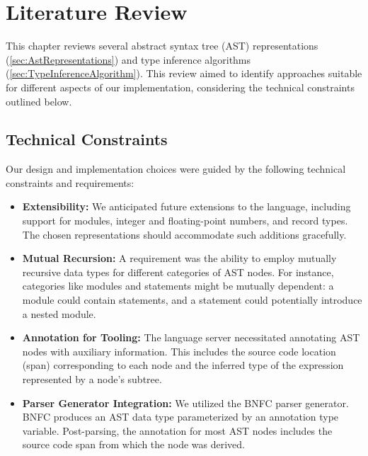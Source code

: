 \chapter{Literature Review}
\label{chap:LiteratureReview}

This chapter reviews several abstract syntax tree (AST) representations (\cref{sec:AstRepresentations}) and type inference algorithms (\cref{sec:TypeInferenceAlgorithm}). This review aimed to identify approaches suitable for different aspects of our implementation, considering the technical constraints outlined below.

\section{Technical Constraints}
\label{chap:LiteratureReview:sec:AstRepresentations:TechnicalConstraints}

Our design and implementation choices were guided by the following technical constraints and requirements:

\begin{itemize}
  \item \textbf{Extensibility:} We anticipated future extensions to the language, including support for modules, integer and floating-point numbers, and record types. The chosen representations should accommodate such additions gracefully.
  \item \textbf{Mutual Recursion:} A requirement was the ability to employ mutually recursive data types for different categories of AST nodes. For instance, categories like modules and statements might be mutually dependent: a module could contain statements, and a statement could potentially introduce a nested module.
  \item \textbf{Annotation for Tooling:} The language server necessitated annotating AST nodes with auxiliary information. This includes the source code location (span) corresponding to each node and the inferred type of the expression represented by a node's subtree.
  \item \textbf{Parser Generator Integration:} We utilized the BNFC parser generator. BNFC produces an AST data type parameterized by an annotation type variable. Post-parsing, the annotation for most AST nodes includes the source code span from which the node was derived.
\end{itemize}

